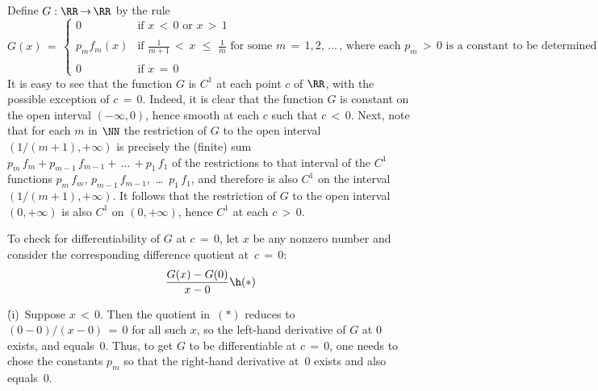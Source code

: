 {\V

        Define $G:{\RR} \,{\rightarrow}\, {\RR}$ by the rule
        \begin{displaymath}
        G(x) \,=\, \left\{
        \begin{array}{cl}
           0     & \mbox{if $x\,<\,0$ or $x\,>\,1$} \\
                 &                                  \\
        {\displaystyle p_{m}f_{m}(x)} & \mbox{if ${\displaystyle \frac{1}{m+1}\,<\,x\,\,{\leq}\,\,\frac{1}{m}}$ for some $m \,=\, 1,2,\,{\ldots}\,$, where each $p_{m}\,>\,0$ is a constant to be determined} \\
                 & \\
            0    & \mbox{if $x \,=\, 0$}
        \end{array}
                                        \right.
        \end{displaymath}
    It is easy to see that the function $G$ is $C^{1}$ at each point $c$ of ${\RR}$, with the possible exception of $c \,=\, 0$.
    Indeed, it is clear that the function $G$ is constant on the open interval $(-{\infty},0)$, hence smooth at each $c$ such that $c\,<\,0$.
    Next, note that for each $m$ in ${\NN}$ the restriction of $G$ to the open interval $(1/(m+1),+{\infty})$
    is precisely the (finite) sum $p_{m}\,f_{m} + p_{m-1}\,f_{m-1} + \,{\ldots}\, + p_{1}\,f_{1}$
    of the restrictions to that interval of the $C^{1}$ functions
    $p_{m}\,f_{m}$, $p_{m-1}\,f_{m-1}$, \,{\ldots}\, $p_{1}\,f_{1}$, and therefore is also $C^{1}$ on the interval $(1/(m+1),+{\infty})$.
    It follows that the restriction of $G$ to the open interval $(0,+{\infty})$ is also $C^{1}$ on $(0,+{\infty})$, hence $C^{1}$ at each $c\,>\,0$.

    To check for differentiability of $G$ at $c \,=\, 0$, let $x$ be any nonzero number and consider the corresponding difference quotient at~$c \,=\, 0$:
        \begin{displaymath}
        \frac{G(x)-G(0)}{x-0} \h ({\ast})
        \end{displaymath}

    \h (i)\, Suppose $x\,<\,0$. Then the quotient in~$({\ast})$ reduces to $(0-0)/(x-0) \,=\, 0$ for all such $x$,
    so the left-hand derivative of $G$ at $0$ exists, and equals~$0$. Thus, to get $G$ to be differentiable at $c \,=\, 0$,
    one needs to chose the constants $p_{m}$ so that the right-hand derivative at~$0$ exists and also equals~$0$.

}

